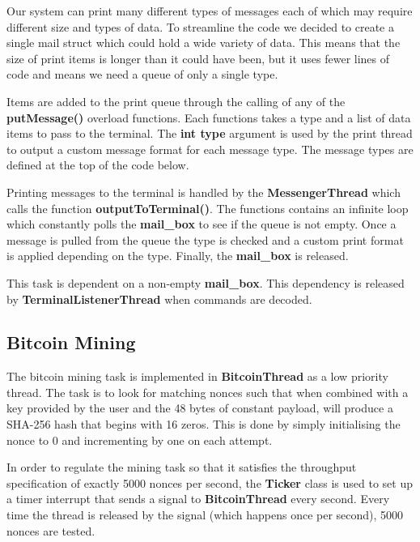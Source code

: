 \documentclass{article}
\begin{document}
\noindent
Our system can print many different types of messages each of which may require different size and types of data.
To streamline the code we decided to create a single mail struct which could hold a wide variety of data. This means that the size of print items is longer than it could have been, but it uses fewer lines of code and means we need a queue of only a single type.

\bigskip

\noindent
Items are added to the print queue through the calling of any of the \textbf{putMessage()} overload functions. Each functions takes a type and a list of data items to pass to the terminal. The \textbf{int type} argument is used by the print thread to output a custom message format for each message type. The message types are defined at the top of the code below.

\bigskip

\bigskip

\noindent
Printing messages to the terminal is handled by the \textbf{MessengerThread} which calls the function \textbf{outputToTerminal()}. The functions contains an infinite loop which constantly polls the \textbf{mail\_box} to see if the queue is not empty. Once a message is pulled from the queue the type is checked and a custom print format is applied depending on the type. Finally, the \textbf{mail\_box} is released.


\bigskip

\bigskip

\noindent
This task is dependent on a non-empty \textbf{mail\_box}. This dependency is released by \textbf{TerminalListenerThread} when commands are decoded.

\subsection{Bitcoin Mining}

\noindent
The bitcoin mining task is implemented in \textbf{BitcoinThread} as a low priority thread. The task is to look for matching nonces such that when combined with a key provided by the user and the 48 bytes of constant payload, will produce a SHA-256 hash that begins with 16 zeros. This is done by simply initialising the nonce to 0 and incrementing by one on each attempt.

\bigskip

\noindent
In order to regulate the mining task so that it satisfies the throughput specification of exactly 5000 nonces per second, the \textbf{Ticker} class is used to set up a timer interrupt that sends a signal to \textbf{BitcoinThread} every second. Every time the thread is released by the signal (which happens once per second), 5000 nonces are tested.
\end{document}
